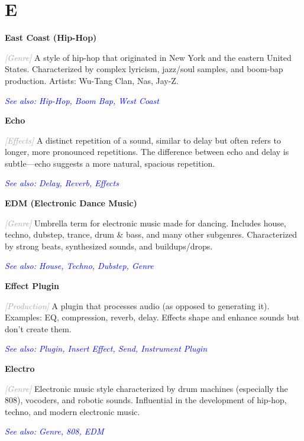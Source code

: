 \documentclass[11pt,letterpaper]{article}
\newcommand{\term}[1]{\textbf{\large\color{purple}#1}}
\newcommand{\category}[1]{\textcolor{darkgray}{\textit{\small [#1]}}}
\newcommand{\seealso}[1]{\textcolor{blue}{\textit{See also: #1}}}
\newenvironment{termdef}[1]
  {\noindent\term{#1}\par\nopagebreak}
  {\par\vspace{0.3em}}
\begin{document}

\section*{E}

\begin{termdef}{East Coast (Hip-Hop)}
\category{Genre}
A style of hip-hop that originated in New York and the eastern United States. Characterized by complex lyricism, jazz/soul samples, and boom-bap production. Artists: Wu-Tang Clan, Nas, Jay-Z.

\seealso{Hip-Hop, Boom Bap, West Coast}
\end{termdef}

\begin{termdef}{Echo}
\category{Effects}
A distinct repetition of a sound, similar to delay but often refers to longer, more pronounced repetitions. The difference between echo and delay is subtle—echo suggests a more natural, spacious repetition.

\seealso{Delay, Reverb, Effects}
\end{termdef}

\begin{termdef}{EDM (Electronic Dance Music)}
\category{Genre}
Umbrella term for electronic music made for dancing. Includes house, techno, dubstep, trance, drum \& bass, and many other subgenres. Characterized by strong beats, synthesized sounds, and buildups/drops.

\seealso{House, Techno, Dubstep, Genre}
\end{termdef}

\begin{termdef}{Effect Plugin}
\category{Production}
A plugin that processes audio (as opposed to generating it). Examples: EQ, compression, reverb, delay. Effects shape and enhance sounds but don't create them.

\seealso{Plugin, Insert Effect, Send, Instrument Plugin}
\end{termdef}

\begin{termdef}{Electro}
\category{Genre}
Electronic music style characterized by drum machines (especially the 808), vocoders, and robotic sounds. Influential in the development of hip-hop, techno, and modern electronic music.

\seealso{Genre, 808, EDM}
\end{termdef}
\end{document}
